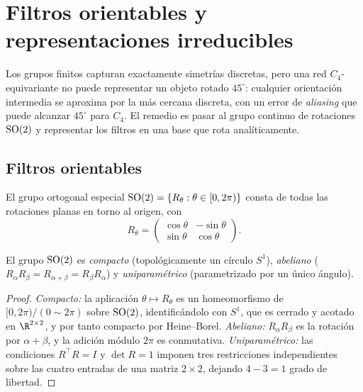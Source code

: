 \section{Filtros orientables y representaciones irreducibles}
\label{sec:groups:steerable}

Los grupos finitos capturan exactamente simetr\'ias discretas, pero una red
$C_4$-equivariante no puede representar un objeto rotado $45^\circ$: cualquier
orientaci\'on intermedia se aproxima por la m\'as cercana discreta, con un error
de \emph{aliasing} que puede alcanzar $45^\circ$ para $C_4$. El remedio es pasar
al grupo continuo de rotaciones $\SO(2)$ y representar los filtros en una base
que rota anal\'iticamente.

\subsection{Filtros orientables}
\label{sec:groups:steerable-filters}

\begin{definition}[El grupo $\SO(2)$]
\label{def:groups:so2}
El grupo ortogonal especial $\operatorname{SO}(2) = \{R_\theta : \theta \in [0, 2\pi)\}$ consta
de todas las rotaciones planas en torno al origen, con
\begin{equation}
  R_\theta = \begin{pmatrix} \cos\theta & -\sin\theta \\
                             \sin\theta & \cos\theta \end{pmatrix}.
\end{equation}
\end{definition}

\begin{proposition}[Propiedades de $\SO(2)$]
\label{prop:groups:so2-properties}
El grupo $\SO(2)$ es \emph{compacto} (topol\'ogicamente un c\'irculo $S^1$),
\emph{abeliano} ($R_\alpha R_\beta = R_{\alpha+\beta} = R_\beta R_\alpha$) y
\emph{uniparam\'etrico} (parametrizado por un \'unico \'angulo).
\end{proposition}

\begin{proof}
\emph{Compacto:} la aplicaci\'on $\theta \mapsto R_\theta$ es un homeomorfismo de
$[0,2\pi)/(0 \sim 2\pi)$ sobre $\SO(2)$, identific\'andolo con $S^1$, que es
cerrado y acotado en $\R^{2 \times 2}$, y por tanto compacto por
Heine--Borel. \emph{Abeliano:} $R_\alpha R_\beta$ es la rotaci\'on por $\alpha +
\beta$, y la adici\'on m\'odulo $2\pi$ es conmutativa. \emph{Uniparam\'etrico:}
las condiciones $R^\top R = I$ y $\det R = 1$ imponen tres restricciones
independientes sobre las cuatro entradas de una matriz $2 \times 2$, dejando $4 -
3 = 1$ grado de libertad.
\end{proof}


